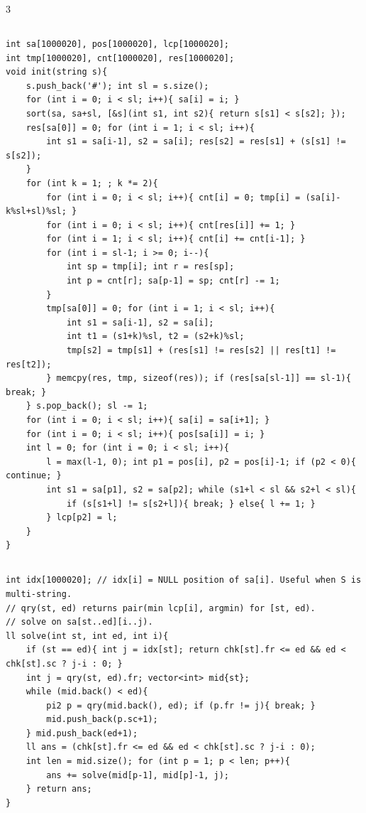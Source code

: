 \documentclass[landscape, 8pt, a4paper, oneside]{extarticle}
\begin{document}
\begin{multicols*}{3}
\subsection{}
\begin{verbatim}
int sa[1000020], pos[1000020], lcp[1000020];
int tmp[1000020], cnt[1000020], res[1000020];
void init(string s){
	s.push_back('#'); int sl = s.size();
	for (int i = 0; i < sl; i++){ sa[i] = i; }
	sort(sa, sa+sl, [&s](int s1, int s2){ return s[s1] < s[s2]; });
	res[sa[0]] = 0; for (int i = 1; i < sl; i++){
		int s1 = sa[i-1], s2 = sa[i]; res[s2] = res[s1] + (s[s1] != s[s2]);
	}
	for (int k = 1; ; k *= 2){
		for (int i = 0; i < sl; i++){ cnt[i] = 0; tmp[i] = (sa[i]-k%sl+sl)%sl; }
		for (int i = 0; i < sl; i++){ cnt[res[i]] += 1; }
		for (int i = 1; i < sl; i++){ cnt[i] += cnt[i-1]; }
		for (int i = sl-1; i >= 0; i--){
			int sp = tmp[i]; int r = res[sp];
			int p = cnt[r]; sa[p-1] = sp; cnt[r] -= 1;
		}
		tmp[sa[0]] = 0; for (int i = 1; i < sl; i++){
			int s1 = sa[i-1], s2 = sa[i];
			int t1 = (s1+k)%sl, t2 = (s2+k)%sl;
			tmp[s2] = tmp[s1] + (res[s1] != res[s2] || res[t1] != res[t2]);
		} memcpy(res, tmp, sizeof(res)); if (res[sa[sl-1]] == sl-1){ break; }
	} s.pop_back(); sl -= 1;
	for (int i = 0; i < sl; i++){ sa[i] = sa[i+1]; }
	for (int i = 0; i < sl; i++){ pos[sa[i]] = i; }
	int l = 0; for (int i = 0; i < sl; i++){
		l = max(l-1, 0); int p1 = pos[i], p2 = pos[i]-1; if (p2 < 0){ continue; }
		int s1 = sa[p1], s2 = sa[p2]; while (s1+l < sl && s2+l < sl){
			if (s[s1+l] != s[s2+l]){ break; } else{ l += 1; }
		} lcp[p2] = l;
	}
}
\end{verbatim}
\subsection{}
\begin{verbatim}
int idx[1000020]; // idx[i] = NULL position of sa[i]. Useful when S is multi-string.
// qry(st, ed) returns pair(min lcp[i], argmin) for [st, ed).
// solve on sa[st..ed][i..j).
ll solve(int st, int ed, int i){
	if (st == ed){ int j = idx[st]; return chk[st].fr <= ed && ed < chk[st].sc ? j-i : 0; }
	int j = qry(st, ed).fr; vector<int> mid{st};
	while (mid.back() < ed){
		pi2 p = qry(mid.back(), ed); if (p.fr != j){ break; }
		mid.push_back(p.sc+1);
	} mid.push_back(ed+1);
	ll ans = (chk[st].fr <= ed && ed < chk[st].sc ? j-i : 0);
	int len = mid.size(); for (int p = 1; p < len; p++){
		ans += solve(mid[p-1], mid[p]-1, j);
	} return ans;
}
\end{verbatim}

\end{multicols*}
\end{document}
